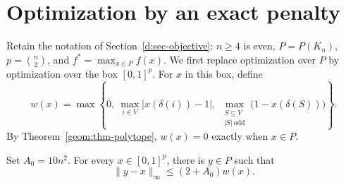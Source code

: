 \section{Optimization by an exact penalty}
\label{d:sec-optimization}

Retain the notation of Section~\ref{d:sec-objective}: \(n\ge4\) is even,
\(P=P(K_n)\), \(p=\binom n2\), and
\(f^*=\max_{x\in P}f(x)\).
We first replace optimization over \(P\) by optimization over the box
\([0,1]^p\).  For \(x\) in this box, define
\begin{equation}
\label{d:eq-max-violation}
w(x)=
\max\left\{
0,\ 
\max_{i\in V}\bigl|x(\delta(i))-1\bigr|,\ 
\max_{\substack{S\subseteq V\\ |S|\ \text{odd}}}
       \bigl(1-x(\delta(S))\bigr)
\right\}.
\end{equation}
By Theorem~\ref{geom:thm-polytope}, \(w(x)=0\) exactly when \(x\in P\).

\begin{lemma}
\label{d:lem-feasibility-repair}
Set \(A_0=10n^2\).  For every \(x\in[0,1]^p\), there is \(y\in P\) such that
\[
\|y-x\|_\infty\le (2+A_0)w(x).
\]
\end{lemma}

